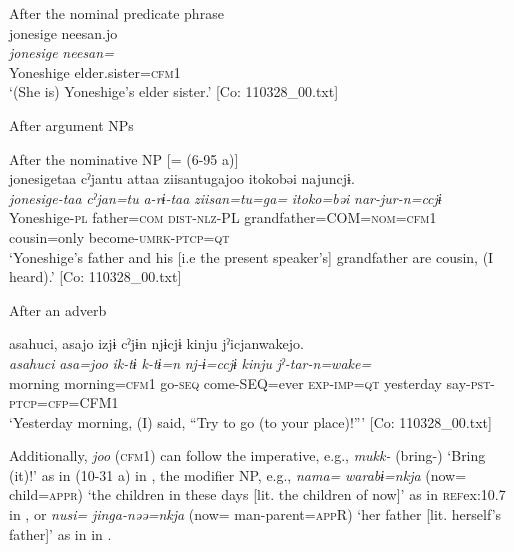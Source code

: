 \begin{xlist}
   \ex After the nominal predicate phrase\\
      \glll    jonesige  {\textbar}neesan{\textbar}.jo\\
      \textit{jonesige}  \textit{neesan=}\\
      Yoneshige  elder.sister=\textsc{cfm}1\\
      \glt       ‘(She is) Yoneshige’s elder sister.’ [Co: 110328\_00.txt]

  \exi{} After argument NPs

  \ex  After the nominative NP [= (6-95 a)]\\
      \glll    jonesigetaa  cˀjantu  attaa  ziisantugajoo   {\textbar}itoko{\textbar}bəi  najuncjɨ.\\                                                                                             
      \textit{jonesige-taa}  \textit{cˀjan=tu}  \textit{a-rɨ-taa}  \textit{ziisan=tu=ga=} \textit{itoko=bəi}  \textit{nar-jur-n=ccjɨ}\\                                                                                             
      Yoneshige-\textsc{pl}  father=\textsc{com}  \textsc{dist}-\textsc{nlz}-PL  grandfather=COM=\textsc{nom}=\textsc{cfm}1   cousin=only  become-\textsc{umrk}-\textsc{ptcp}=\textsc{qt}\\
      \glt ‘Yoneshige’s father and his [i.e the present speaker’s] grandfather are cousin, (I heard).’ [Co: 110328\_00.txt]

  \exi{} After an adverb

  \ex  %
      \glll    asahuci,  asajo  izjɨ  cˀjɨn  njɨcjɨ  kinju  jˀicjanwakejo.\\                                                                                              
      \textit{asahuci}  \textit{asa=joo}  \textit{ik-tɨ}  \textit{k-tɨ=n}  \textit{nj-ɨ=ccjɨ} \textit{kinju}  \textit{jˀ-tar-n=wake=}\\                                                                                              
      morning  morning=\textsc{cfm}1  go-\textsc{seq}  come-SEQ=ever  \textsc{exp}-\textsc{imp}=\textsc{qt}   yesterday  say-\textsc{pst}-\textsc{ptcp}=\textsc{cfp}=CFM1\\
      \glt ‘Yesterday morning, (I) said, “Try to go (to your place)!”’      [Co: 110328\_00.txt]
    \end{xlist}
\z

Additionally, \textit{joo} (\textsc{cfm}1) can follow the imperative, e.g., \textit{mukk-} (bring-) ‘Bring (it)!’ as in (10-31 a) in , the modifier NP, e.g., \textit{nama=} \textit{warabɨ=nkja} (now= child=\textsc{appr}) ‘the children in these days [lit. the children of now]’ as in \textsc{ref}{ex:10.7} in , or \textit{nusi=} \textit{jinga-nəə=nkja} (now= man-parent=\textsc{app}R) ‘her father [lit. herself’s father]’ as in  in .

